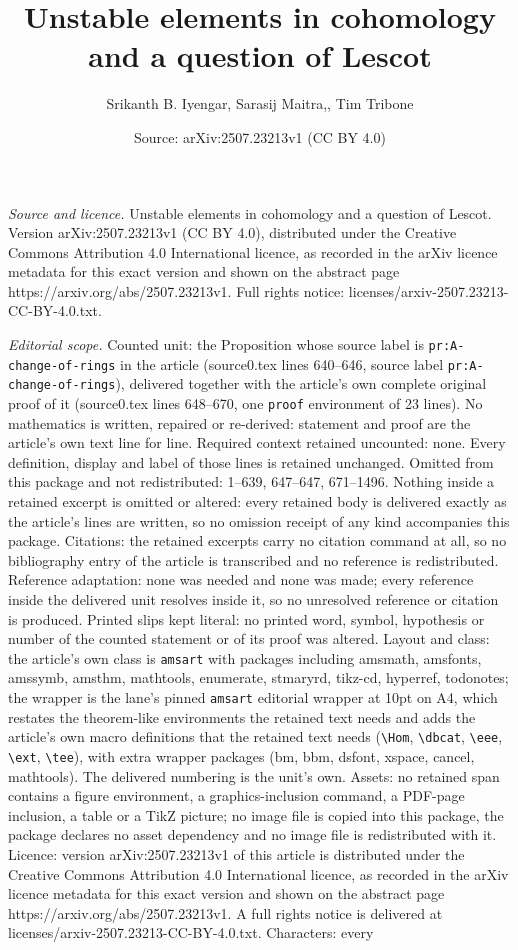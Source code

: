 \documentclass[10pt,a4paper]{amsart}
\title[Unstable elements in cohomology and a question of Lescot]{Unstable elements in cohomology and a question of Lescot}
\author{Srikanth B. Iyengar, Sarasij Maitra,, Tim Tribone}
\date{Source: arXiv:2507.23213v1 (CC BY 4.0)}
\begin{document}
\maketitle

\noindent\emph{Source and licence.} Unstable elements in cohomology and a question of Lescot. Version arXiv:2507.23213v1 (CC BY 4.0), distributed under the Creative Commons Attribution 4.0 International licence, as recorded in the arXiv licence metadata for this exact version and shown on the abstract page https://arxiv.org/abs/2507.23213v1. Full rights notice: licenses/arxiv-2507.23213-CC-BY-4.0.txt.\par\smallskip

\noindent\textit{Editorial scope.} Counted unit: the Proposition whose source label is \texttt{pr:A-change-of-rings} in the article (source0.tex lines 640--646, source label \texttt{pr:A-change-of-rings}), delivered together with the article's own complete original proof of it (source0.tex lines 648--670, one \texttt{proof} environment of 23 lines). No mathematics is written, repaired or re-derived: statement and proof are the article's own text line for line. Required context retained uncounted: none. Every definition, display and label of those lines is retained unchanged. Omitted from this package and not redistributed: 1--639, 647--647, 671--1496. Nothing inside a retained excerpt is omitted or altered: every retained body is delivered exactly as the article's lines are written, so no omission receipt of any kind accompanies this package. Citations: the retained excerpts carry no citation command at all, so no bibliography entry of the article is transcribed and no reference is redistributed. Reference adaptation: none was needed and none was made; every reference inside the delivered unit resolves inside it, so no unresolved reference or citation is produced. Printed slips kept literal: no printed word, symbol, hypothesis or number of the counted statement or of its proof was altered. Layout and class: the article's own class is \texttt{amsart} with packages including amsmath, amsfonts, amssymb, amsthm, mathtools, enumerate, stmaryrd, tikz-cd, hyperref, todonotes; the wrapper is the lane's pinned \texttt{amsart} editorial wrapper at 10pt on A4, which restates the theorem-like environments the retained text needs and adds the article's own macro definitions that the retained text needs (\texttt{\textbackslash Hom}, \texttt{\textbackslash dbcat}, \texttt{\textbackslash eee}, \texttt{\textbackslash ext}, \texttt{\textbackslash tee}), with extra wrapper packages (bm, bbm, dsfont, xspace, cancel, mathtools). The delivered numbering is the unit's own. Assets: no retained span contains a figure environment, a graphics-inclusion command, a PDF-page inclusion, a table or a TikZ picture; no image file is copied into this package, the package declares no asset dependency and no image file is redistributed with it. Licence: version arXiv:2507.23213v1 of this article is distributed under the Creative Commons Attribution 4.0 International licence, as recorded in the arXiv licence metadata for this exact version and shown on the abstract page https://arxiv.org/abs/2507.23213v1. A full rights notice is delivered at licenses/arxiv-2507.23213-CC-BY-4.0.txt. Characters: every 
\end{document}
